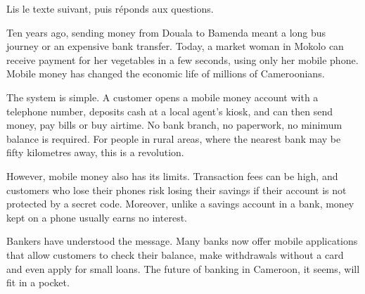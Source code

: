 \documentclass[11pt]{article}
\begin{document}
\begin{exercice}
Lis le texte suivant, puis réponds aux questions.

\begin{textebox}
Ten years ago, sending money from Douala to Bamenda meant a long bus journey or an expensive bank transfer. Today, a market woman in Mokolo can receive payment for her vegetables in a few seconds, using only her mobile phone. Mobile money has changed the economic life of millions of Cameroonians.

The system is simple. A customer opens a mobile money account with a telephone number, deposits cash at a local agent's kiosk, and can then send money, pay bills or buy airtime. No bank branch, no paperwork, no minimum balance is required. For people in rural areas, where the nearest bank may be fifty kilometres away, this is a revolution.

However, mobile money also has its limits. Transaction fees can be high, and customers who lose their phones risk losing their savings if their account is not protected by a secret code. Moreover, unlike a savings account in a bank, money kept on a phone usually earns no interest.

Bankers have understood the message. Many banks now offer mobile applications that allow customers to check their balance, make withdrawals without a card and even apply for small loans. The future of banking in Cameroon, it seems, will fit in a pocket.
\end{textebox}


\end{exercice}
\end{document}
